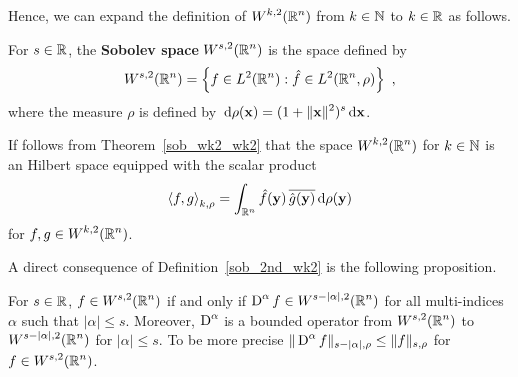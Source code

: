 Hence, we can expand the definition of
$\displaystyle W^{k,2}(\mathbb{R}^n)$ from $k \in\mathbb{N}$ to $k\in \mathbb{R}$ as follows.

\begin{defn} \label{sob_2nd_wk2}
For $s\in \mathbb{R}$, the
{\bfseries Sobolev space}
$\displaystyle W^{s,2}(\mathbb{R}^n)$ is the space defined by
\[
W^{s,2}(\mathbb{R}^n) = \left\{ f \in L^2(\mathbb{R}^n) : \hat{f} \in
  L^2(\mathbb{R}^n,\rho) \right\} \ ,
\]
where the measure $\rho$ is defined by
$\displaystyle \,\mathrm{d}{\rho(\mathbf{x})} = (1+\|\mathbf{x}\|^2)^s\,\mathrm{d}{\mathbf{x}}$.
\end{defn}

If follows from Theorem~\ref{sob_wk2_wk2} that the space
$\displaystyle W^{k,2}(\mathbb{R}^n)$ for $k \in \mathbb{N}$ is an Hilbert space
equipped with the scalar product
\begin{equation} \label{sob_sp_wkmu}
\left\langle{f} , {g}\right\rangle_{k,\rho} = \int_{\mathbb{R}^n} \hat{f}(\mathbf{y})\, \overline{\hat{g}(\mathbf{y})}
\,\mathrm{d}{\rho(\mathbf{y})}
\end{equation}
for $\displaystyle f,g \in W^{k,2}(\mathbb{R}^n)$.

A direct consequence of Definition~\ref{sob_2nd_wk2} is the following
proposition.

\begin{prop} \label{sob_DinDm}
For $s\in \mathbb{R}$, $\displaystyle f\in W^{s,2}(\mathbb{R}^n)$ if and only if
$\displaystyle \operatorname{D}^\alpha f \in W^{s-|\alpha|,2}(\mathbb{R}^n)$ for all
multi-indices $\alpha$ such that $|\alpha|\leq s$.  Moreover,
$\displaystyle \operatorname{D}^\alpha$ is a bounded operator
from $\displaystyle W^{s,2}(\mathbb{R}^n)$ to
$\displaystyle W^{s-|\alpha|,2}(\mathbb{R}^n)$ for $|\alpha|\leq s$.  To be
more precise
$\displaystyle \|\operatorname{D}^\alpha f\|_{s-|\alpha|,\rho}
\leq \|f\|_{s,\rho}$ for $\displaystyle f\in W^{s,2}(\mathbb{R}^n)$.
\end{prop}

